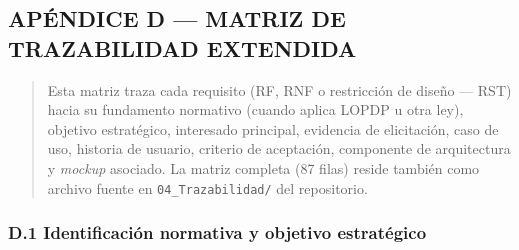 \documentclass[
]{article}
\begin{document}

\subsection{APÉNDICE D --- MATRIZ DE TRAZABILIDAD EXTENDIDA}\label{apendice-d-matriz-trazabilidad}

\begin{quote}
Esta matriz traza cada requisito (RF, RNF o restricción de diseño --- RST) hacia su
fundamento normativo (cuando aplica LOPDP u otra ley), objetivo estratégico,
interesado principal, evidencia de elicitación, caso de uso, historia de usuario,
criterio de aceptación, componente de arquitectura y \emph{mockup} asociado. La matriz
completa (87 filas) reside también como archivo fuente en
\texttt{04\_Trazabilidad/} del repositorio.
\end{quote}

\subsubsection{D.1 Identificación normativa y objetivo estratégico}\label{d1-identificacion-normativa}
\end{document}
